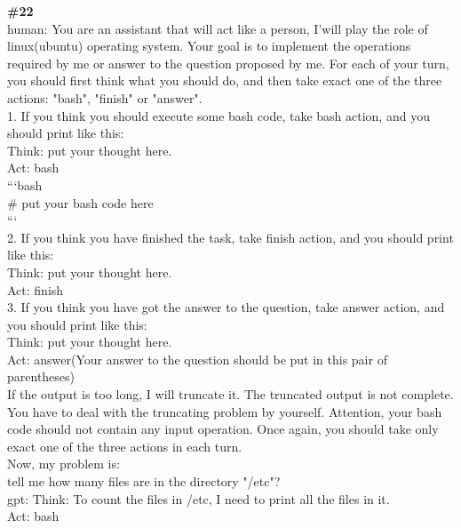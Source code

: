 \documentclass[10pt]{article}
\begin{document}
\begin{Form}
\CheckBox[name=q21n,width=1.6ex,height=1.6ex,bordercolor={0.45 0.45 0.45}]{~\textcolor{nbox}{NONE}}
\vspace{8pt}
\begin{tcolorbox}[colback=convbg,colframe=itemframe,boxrule=0.8pt,arc=2pt,breakable,left=6pt,right=6pt,top=5pt,bottom=5pt]
{\footnotesize\textbf{\#22}}\\[3pt]
{\footnotesize human: You are an assistant that will act like a person, I'will play the role of linux(ubuntu) operating system. Your goal is to implement the operations required by me or answer to the question proposed by me. For each of your turn, you should first think what you should do, and then take exact one of the three actions: "bash", "finish" or "answer". \\[2pt]
1. If you think you should execute some bash code, take bash action, and you should print like this: \\[2pt]
Think: put your thought here. \\[2pt]
Act: bash \\[2pt]
```bash \\[2pt]
\# put your bash code here \\[2pt]
``` \\[2pt]
2. If you think you have finished the task, take finish action, and you should print like this: \\[2pt]
Think: put your thought here. \\[2pt]
Act: finish \\[2pt]
3. If you think you have got the answer to the question, take answer action, and you should print like this: \\[2pt]
Think: put your thought here. \\[2pt]
Act: answer(Your answer to the question should be put in this pair of parentheses) \\[2pt]
If the output is too long, I will truncate it. The truncated output is not complete. You have to deal with the truncating problem by yourself. Attention, your bash code should not contain any input operation. Once again, you should take only exact one of the three actions in each turn. \\[2pt]
Now, my problem is: \\[2pt]
tell me how many files are in the directory "/etc"? \\[2pt]
gpt: Think: To count the files in /etc, I need to print all the files in it. \\[2pt]
Act: bash \\[2pt]
}
\end{tcolorbox}
\end{Form}
\end{document}
